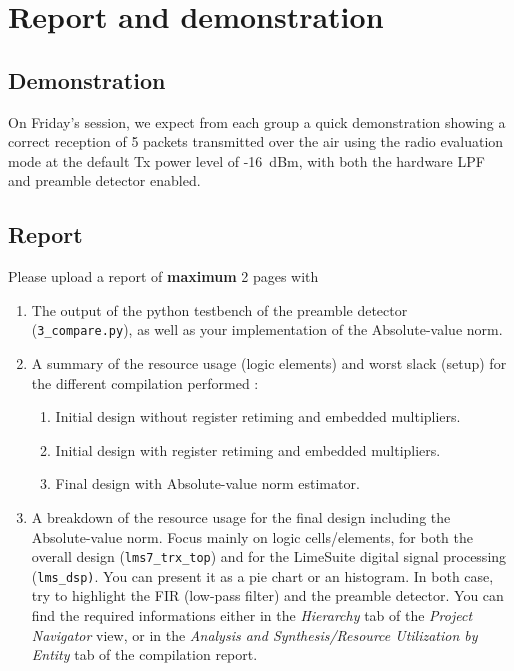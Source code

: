 \section{Report and demonstration}

\subsection{Demonstration}

On Friday's session, we expect from each group a quick demonstration showing a correct reception of 5 packets transmitted over the air using the radio evaluation mode
at the default Tx power level of -16~dBm, with both the hardware LPF and preamble detector enabled.

\subsection{Report}

Please upload a report of \textbf{maximum} 2 pages with
\begin{enumerate}
    \item The output of the python testbench of the preamble detector (\texttt{3\_compare.py}), as well as your implementation of the Absolute-value norm.

    \item A summary of the resource usage (logic elements) and worst slack (setup) for the different compilation performed :
    \begin{enumerate}
        \item Initial design without register retiming and embedded multipliers.
        \item Initial design with register retiming and embedded multipliers.
        \item Final design with Absolute-value norm estimator.
    \end{enumerate}

    \item A breakdown of the resource usage for the final design including the Absolute-value norm. Focus mainly on logic cells/elements, for both the overall design (\texttt{lms7\_trx\_top}) and for the LimeSuite digital signal processing (\texttt{lms\_dsp)}. You can present it as a pie chart or an histogram. In both case, try to highlight the FIR (low-pass filter) and the preamble detector. You can find the required informations either in the \textit{Hierarchy} tab of the \textit{Project Navigator} view, or in the \textit{Analysis and Synthesis/Resource Utilization by Entity} tab of the compilation report.
\end{enumerate}
